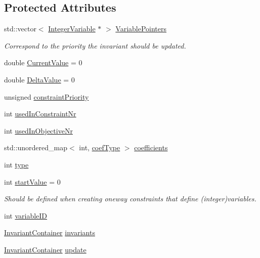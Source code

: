 \subsection*{Protected Attributes}
\begin{DoxyCompactItemize}
\item 
std\-::vector$<$ \hyperlink{class_integer_variable}{Integer\-Variable} $\ast$ $>$ \hyperlink{class_invariant_a86da68637f1714836eb31c302c01362b}{Variable\-Pointers}
\begin{DoxyCompactList}\small\item\em Correspond to the priority the invariant should be updated. \end{DoxyCompactList}\item 
double \hyperlink{class_invariant_a7208e25abfb820cc51b10659316deef2}{Current\-Value} = 0
\item 
double \hyperlink{class_invariant_ad447ae680438882a5c7fdd413ac3f672}{Delta\-Value} = 0
\item 
unsigned \hyperlink{class_invariant_a8d6f849b13550302c1d8e6f864f3962d}{constraint\-Priority}
\item 
int \hyperlink{class_invariant_a504c74e6a18a4e5bc2725961973d0fb3}{used\-In\-Constraint\-Nr}
\item 
int \hyperlink{class_invariant_a938a068c1f8bf551a2f53fba703927b1}{used\-In\-Objective\-Nr}
\item 
std\-::unordered\-\_\-map$<$ int, \hyperlink{_constants_8hpp_a08c47c54ab9fb1545c341ec853cc2278}{coef\-Type} $>$ \hyperlink{class_invariant_a6967f2c1b39c944ffd432528c40d4f23}{coefficients}
\item 
int \hyperlink{class_invariant_ae3f0977038deba2ace1016bc08c35c16}{type}
\item 
int \hyperlink{class_invariant_a7ec1254b39fa2214a2651e366d7dd4b1}{start\-Value} = 0
\begin{DoxyCompactList}\small\item\em Should be defined when creating oneway constraints that define (integer)variables. \end{DoxyCompactList}\item 
int \hyperlink{class_invariant_a7fe4c133c9815c49a3fa4e1ff38b444a}{variable\-I\-D}
\item 
\hyperlink{_constants_8hpp_a5ea9d0c2efe357d2a7f5bcd80cdf179a}{Invariant\-Container} \hyperlink{class_invariant_aca92a5d3c48153074a3b542ed7d8bb88}{invariants}
\item 
\hyperlink{_constants_8hpp_a5ea9d0c2efe357d2a7f5bcd80cdf179a}{Invariant\-Container} \hyperlink{class_invariant_ac88f162ea49e7b4469917e010f639da3}{update}
\end{DoxyCompactItemize}
